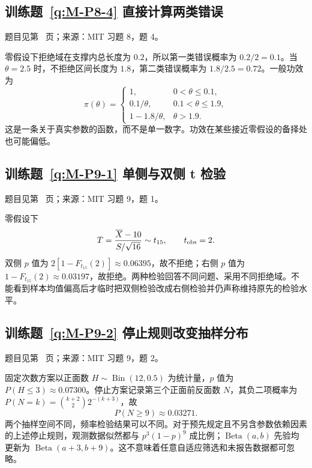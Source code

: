 \documentclass[UTF8,12pt,a4paper,fontset=fandol]{ctexbook}
\begin{document}
\subsection*{训练题~\ref{q:M-P8-4} 直接计算两类错误}\label{a:M-P8-4}{\small 题目见第~\pageref{q:M-P8-4} 页；来源：MIT 习题 8，题 4。}
\begin{solve}零假设下拒绝域在支撑内总长度为 $0.2$，所以第一类错误概率为 $0.2/2=0.1$。当 $\theta=2.5$ 时，不拒绝区间长度为 $1.8$，第二类错误概率为 $1.8/2.5=0.72$。一般功效为\[\pi(\theta)=\begin{cases}1,&0<\theta\le0.1,\\0.1/\theta,&0.1<\theta\le1.9,\\1-1.8/\theta,&\theta>1.9.\end{cases}\]这是一条关于真实参数的函数，而不是单一数字。功效在某些接近零假设的备择处也可能偏低。\end{solve}

\subsection*{训练题~\ref{q:M-P9-1} 单侧与双侧 t 检验}\label{a:M-P9-1}{\small 题目见第~\pageref{q:M-P9-1} 页；来源：MIT 习题 9，题 1。}
\begin{solve}零假设下\[T=\frac{\overline X-10}{S/\sqrt{16}}\sim t_{15},\qquad t_{\rm obs}=2.\]双侧 $p$ 值为 $2[1-F_{t_{15}}(2)]\approx0.06395$，故不拒绝；右侧 $p$ 值为 $1-F_{t_{15}}(2)\approx0.03197$，故拒绝。两种检验回答不同问题、采用不同拒绝域。不能看到样本均值偏高后才临时把双侧检验改成右侧检验并仍声称维持原先的检验水平。\end{solve}

\subsection*{训练题~\ref{q:M-P9-2} 停止规则改变抽样分布}\label{a:M-P9-2}{\small 题目见第~\pageref{q:M-P9-2} 页；来源：MIT 习题 9，题 2。}
\begin{solve}固定次数方案以正面数 $H\sim\operatorname{Bin}(12,0.5)$ 为统计量，$p$ 值为 $P(H\le3)\approx0.07300$。停止方案记录第三个正面前反面数 $N$，其负二项概率为 $P(N=k)=\binom{k+2}{2}2^{-(k+3)}$，故\[P(N\ge9)\approx0.03271.\]两个抽样空间不同，频率检验结果可以不同。对于预先规定且不另含参数依赖因素的上述停止规则，观测数据似然都与 $p^3(1-p)^9$ 成比例；$\operatorname{Beta}(a,b)$ 先验均更新为 $\operatorname{Beta}(a+3,b+9)$。这不意味着任意自适应筛选和未报告数据都可忽略。\end{solve}
\end{document}
